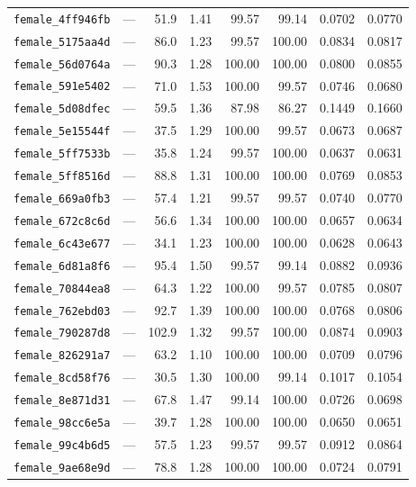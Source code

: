 \begin{longtable}{lrrrrrrr}
\texttt{female\_4ff946fb} & --- & 51.9 & 1.41 & 99.57 & 99.14 & 0.0702 & 0.0770 \\
\texttt{female\_5175aa4d} & --- & 86.0 & 1.23 & 99.57 & 100.00 & 0.0834 & 0.0817 \\
\texttt{female\_56d0764a} & --- & 90.3 & 1.28 & 100.00 & 100.00 & 0.0800 & 0.0855 \\
\texttt{female\_591e5402} & --- & 71.0 & 1.53 & 100.00 & 99.57 & 0.0746 & 0.0680 \\
\texttt{female\_5d08dfec} & --- & 59.5 & 1.36 & 87.98 & 86.27 & 0.1449 & 0.1660 \\
\texttt{female\_5e15544f} & --- & 37.5 & 1.29 & 100.00 & 99.57 & 0.0673 & 0.0687 \\
\texttt{female\_5ff7533b} & --- & 35.8 & 1.24 & 99.57 & 100.00 & 0.0637 & 0.0631 \\
\texttt{female\_5ff8516d} & --- & 88.8 & 1.31 & 100.00 & 100.00 & 0.0769 & 0.0853 \\
\texttt{female\_669a0fb3} & --- & 57.4 & 1.21 & 99.57 & 99.57 & 0.0740 & 0.0770 \\
\texttt{female\_672c8c6d} & --- & 56.6 & 1.34 & 100.00 & 100.00 & 0.0657 & 0.0634 \\
\texttt{female\_6c43e677} & --- & 34.1 & 1.23 & 100.00 & 100.00 & 0.0628 & 0.0643 \\
\texttt{female\_6d81a8f6} & --- & 95.4 & 1.50 & 99.57 & 99.14 & 0.0882 & 0.0936 \\
\texttt{female\_70844ea8} & --- & 64.3 & 1.22 & 100.00 & 99.57 & 0.0785 & 0.0807 \\
\texttt{female\_762ebd03} & --- & 92.7 & 1.39 & 100.00 & 100.00 & 0.0768 & 0.0806 \\
\texttt{female\_790287d8} & --- & 102.9 & 1.32 & 99.57 & 100.00 & 0.0874 & 0.0903 \\
\texttt{female\_826291a7} & --- & 63.2 & 1.10 & 100.00 & 100.00 & 0.0709 & 0.0796 \\
\texttt{female\_8cd58f76} & --- & 30.5 & 1.30 & 100.00 & 99.14 & 0.1017 & 0.1054 \\
\texttt{female\_8e871d31} & --- & 67.8 & 1.47 & 99.14 & 100.00 & 0.0726 & 0.0698 \\
\texttt{female\_98cc6e5a} & --- & 39.7 & 1.28 & 100.00 & 100.00 & 0.0650 & 0.0651 \\
\texttt{female\_99c4b6d5} & --- & 57.5 & 1.23 & 99.57 & 99.57 & 0.0912 & 0.0864 \\
\texttt{female\_9ae68e9d} & --- & 78.8 & 1.28 & 100.00 & 100.00 & 0.0724 & 0.0791 \\

\end{longtable}
